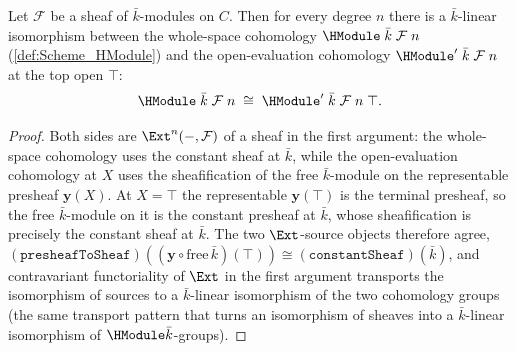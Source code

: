 \begin{lemma}
  \label{lem:HModule_iso_HModule'_top}
  Let \(\mathcal F\) be a sheaf of \(\bar k\)-modules on \(C\). Then for
  every degree \(n\) there is a \(\bar k\)-linear isomorphism between the
  whole-space cohomology \(\HModule\;\bar k\;\mathcal F\;n\)
  (\cref{def:Scheme_HModule}) and the open-evaluation cohomology
  \(\HModule'\;\bar k\;\mathcal F\;n\) at the top open \(\top\):
  \[
    \HModule\;\bar k\;\mathcal F\;n
      \;\cong\;
    \HModule'\;\bar k\;\mathcal F\;n\;\top .
  \]
\end{lemma}

\begin{proof}
  Both sides are \(\Ext^n(-, \mathcal F)\) of a sheaf in the first
  argument: the whole-space cohomology uses the constant sheaf at
  \(\bar k\), while the open-evaluation cohomology at \(X\) uses the
  sheafification of the free \(\bar k\)-module on the representable
  presheaf \(\mathbf y(X)\). At \(X = \top\) the representable
  \(\mathbf y(\top)\) is the terminal presheaf, so the free
  \(\bar k\)-module on it is the constant presheaf at \(\bar k\), whose
  sheafification is precisely the constant sheaf at \(\bar k\). The two
  \(\Ext\)-source objects therefore agree,
  \((\mathtt{presheafToSheaf})((\mathbf y \circ \mathrm{free}\,\bar k)(\top))
  \cong (\mathtt{constantSheaf})(\bar k)\), and contravariant
  functoriality of \(\Ext\) in the first argument transports the
  isomorphism of sources to a \(\bar k\)-linear isomorphism of the two
  cohomology groups (the same transport pattern that turns an
  isomorphism of sheaves into a \(\bar k\)-linear isomorphism of
  \(\HModule \bar k\)-groups).
\end{proof}

